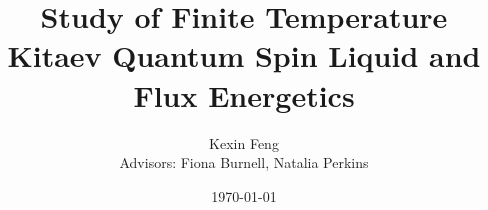 
\title{Study of Finite Temperature Kitaev Quantum Spin Liquid and Flux Energetics} %

\author{Kexin Feng\\
Advisors: Fiona Burnell, Natalia Perkins} %
\date{\today} %



